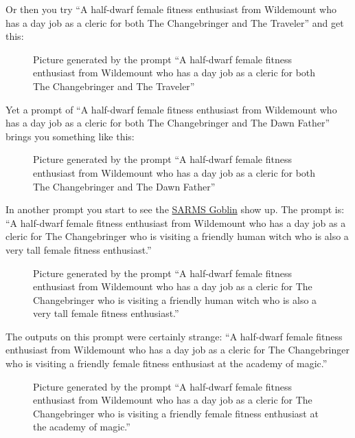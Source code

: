 Or then you try ``A half-dwarf female fitness enthusiast from Wildemount
who has a day job as a cleric for both The Changebringer and The
Traveler'' and get this:

\begin{figure}
\centering
{}
\caption{Picture generated by the prompt ``A half-dwarf female fitness
enthusiast from Wildemount who has a day job as a cleric for both The
Changebringer and The Traveler''}
\end{figure}

Yet a prompt of ``A half-dwarf female fitness enthusiast from Wildemount
who has a day job as a cleric for both The Changebringer and The Dawn
Father'' brings you something like this:

\begin{figure}
\centering
{}
\caption{Picture generated by the prompt ``A half-dwarf female fitness
enthusiast from Wildemount who has a day job as a cleric for both The
Changebringer and The Dawn Father''}
\end{figure}

In another prompt you start to see the
\href{https://knowyourmeme.com/memes/sarm-goblin}{SARMS Goblin} show up.
The prompt is: ``A half-dwarf female fitness enthusiast from Wildemount
who has a day job as a cleric for The Changebringer who is visiting a
friendly human witch who is also a very tall female fitness
enthusiast.''

\begin{figure}
\centering
{}
\caption{Picture generated by the prompt ``A half-dwarf female fitness
enthusiast from Wildemount who has a day job as a cleric for The
Changebringer who is visiting a friendly human witch who is also a very
tall female fitness enthusiast.''}
\end{figure}

The outputs on this prompt were certainly strange: ``A half-dwarf female
fitness enthusiast from Wildemount who has a day job as a cleric for The
Changebringer who is visiting a friendly female fitness enthusiast at
the academy of magic.''

\begin{figure}
\centering
{}
\caption{Picture generated by the prompt ``A half-dwarf female fitness
enthusiast from Wildemount who has a day job as a cleric for The
Changebringer who is visiting a friendly female fitness enthusiast at
the academy of magic.''}
\end{figure}

